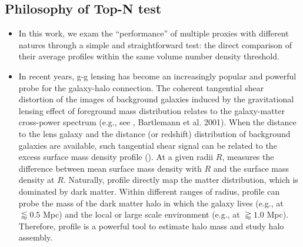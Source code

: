 \documentclass[fleqn,usenatbib,useAMS,english]{mnras}
\begin{document}

\subsection{Philosophy of Top-N test}
    \label{sec:topn_intro}



    \begin{itemize}

        \item In this work, we exam the ``performance'' of multiple \mvir{} proxies with 
            different natures through a simple and straightforward test: the direct comparison 
            of their average \dsigma{} profiles within the same volume number density 
            threshold.
        
        \item In recent years, g-g lensing has become an increasingly popular and powerful 
            probe for the galaxy-halo connection.
            The coherent tangential shear distortion of the images of background galaxies 
            induced by the gravitational lensing effect of foreground mass distribution relates
            to the galaxy-matter cross-power spectrum (e.g., see \addref{}, Bartlemann et al.
            2001).
            When the distance to the lens galaxy and the distance (or redshift) distribution 
            of background galaxies are available, such tangential shear signal can be related
            to the excess surface mass density profile (\dsigma{}).
            At a given radii $R$, \dsigma{} measures the difference between mean surface mass 
            density with $R$ and the surface mass density at $R$.
            Naturally, \dsigma{} profile directly map the matter distribution, which is
            dominated by dark matter.
            Within different ranges of radius, \dsigma{} profile can probe the mass 
            of the dark matter halo in which the galaxy lives (e.g., at $\lessapprox 0.5$ Mpc)
            and the local or large scale environment (e.g., at $\gtrapprox 1.0$ Mpc).
            Therefore, \dsigma{} profile is a powerful tool to estimate halo mass and study 
            halo assembly. 
        

\end{itemize}
\end{document}
